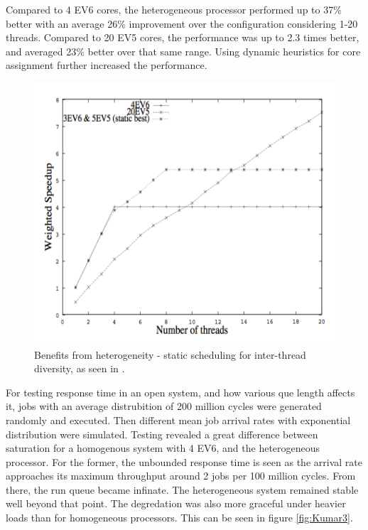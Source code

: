 Compared to 4 EV6 cores, the heterogeneous processor performed up to 37\% better with an average 26\% improvement over the configuration considering 1-20 threads. 
Compared to 20 EV5 cores, the performance was up to 2.3 times better, and averaged 23\% better over that same range. \cite{heterogeneous-perf}
Using dynamic heuristics for core assignment further increased the performance.

\begin{figure}[htb]
    \centering
    \includegraphics[width=1.0\textwidth]{Figures/Heterogeneous/Kumar2}
    \caption{Benefits from heterogeneity - static scheduling for inter-thread diversity, as seen in \cite{heterogeneous-perf}.}
    \label{fig:Kumar2}
\end{figure}

For testing response time in an open system, and how various que length affects it, jobs with an average distrubition of 200 million cycles were generated randomly and executed.
Then different mean job arrival rates with exponential distribution were simulated.
Testing revealed a great difference between saturation for a homogenous system with 4 EV6, and the heterogeneous processor.
For the former, the unbounded response time is seen as the arrival rate approaches its maximum throughput around 2 jobs per 100 million cycles.
From there, the run queue became infinate.
The heterogeneous system remained stable well beyond that point.
The degredation was also more graceful under heavier loads than for homogeneous processors.
This can be seen in figure \ref{fig:Kumar3}.

